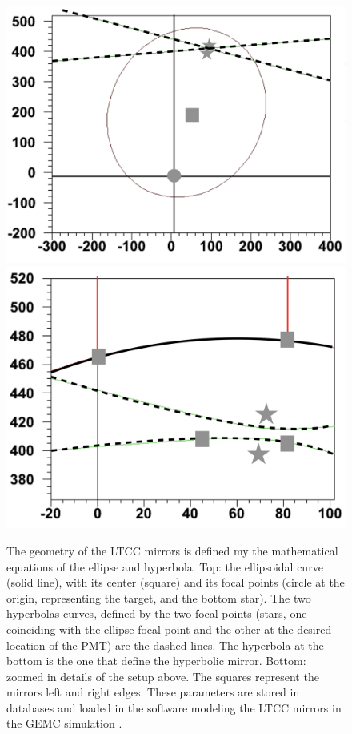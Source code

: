 \begin{figure}
	\centering
	\includegraphics[width=0.98\columnwidth,keepaspectratio]{img/mirrorMath1.png}
	\includegraphics[width=0.98\columnwidth,keepaspectratio]{img/mirrorMath2.png}
	\caption{The geometry of the LTCC mirrors is defined my the mathematical equations of the ellipse and hyperbola.
             Top: the ellipsoidal curve (solid line), with its center (square) and its focal points
             (circle at the origin, representing the target, and the bottom star).
             The two hyperbolas curves, defined by the two focal points (stars, one coinciding with the ellipse
			 focal point and the other at the desired location of the PMT) are the dashed lines. The
			 hyperbola at the bottom is the one that define the hyperbolic mirror.
             Bottom: zoomed in details of the setup above. The squares represent the mirrors left and right edges.
             These parameters are stored in databases and loaded in the software modeling the LTCC mirrors
             in the GEMC simulation \cite{sim-nim}.}
	\label{fig:mirrorMath}
\end{figure}

